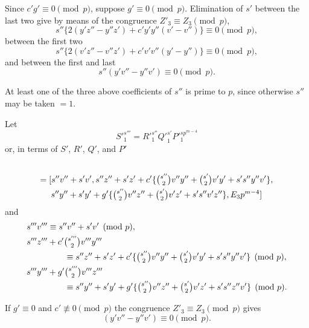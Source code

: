 \documentclass[oneside]{article}
\begin{document}
Since $c'g' \equiv 0 \pmod{p}$, suppose $g' \equiv 0 \pmod{p}$. Elimination
of $s'$ between the last two give by means of the congruence $Z'_3 \equiv
Z_3 \pmod{p}$,
\begin{equation*}
s''\{2(y'z'' - y''z') + c'y'y''(v' - v'')\} \equiv 0 \pmod{p},
\end{equation*}
\noindent between the first two
\begin{equation*}
s''\{2(v'z'' - v''z') + c'v'v''(y' - y'')\} \equiv 0 \pmod{p},
\end{equation*}
\noindent and between the first and last
\begin{equation*}
s''(y'v'' - y''v') \equiv 0 \pmod{p}.
\end{equation*}

At least one of the three above coefficients of $s''$ is prime to $p$,
since otherwise $s''$ may be taken $= 1$.

Let
\begin{equation*}
{S'}_1^{s'''} = {R'}_1^{s''} {Q'}_1^{s'} {P'}_1^{sp^{m-4}}
\end{equation*}
\noindent or, in terms of $S'$, $R'$, $Q'$, and $P'$
\begin{multline*}
[s'''v''', s'''z''' + c'\tbinom{s'''}{2}v'''y''', s'''y''' +
g'\tbinom{s'''}{2}v'''z''', E_2 p^{m-4}] \\ = [s''v'' + s'v', s''z'' + s'z' +
c'\{\tbinom{s''}{2}v''y'' + \tbinom{s'}{2}v'y' + s's''y''v'\}, \\ s''y'' +
s'y' + g'\{\tbinom{s''}{2}v''z'' + \tbinom{s'}{2}v'z' + s's''v'z''\}, E_3 p^{m-4}]
\end{multline*}
\noindent and
\begin{align*}
s'''v''' & \equiv s''v'' + s'v' \pmod{p}, \\
s'''z''' & + c'\tbinom{s'''}{2}v'''y''' \\
  & \qquad \equiv s''z'' + s'z' + c'\{\tbinom{s''}{2}v''y'' + \tbinom{s'}{2}v'y'
    + s's''y''v'\} \pmod{p}, \\
s'''y''' & + g'\tbinom{s'''}{2}v'''z''' \\
  & \qquad \equiv s''y'' + s'y' +  g'\{\tbinom{s''}{2}v''z'' + \tbinom{s'}{2}v'z'
    + s's''z''v'\} \pmod{p}.
\end{align*}

If $g' \equiv 0$ and $c' \not\equiv 0 \pmod{p}$ the congruence $Z'_3
\equiv Z_3 \pmod{p}$ gives
\begin{equation*}
(y'v'' - y''v') \equiv 0 \pmod{p}.
\end{equation*}
\end{document}
